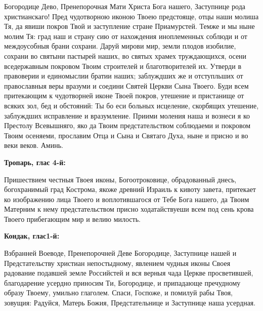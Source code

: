 \bigskip\bigskip\mychapterending

 


Богородице Дево, Пренепорочная Мати Христа Бога нашего, Заступнице рода христианскаго! Пред чудотворною иконою Твоею предстояще, отцы наши молиша Тя, да явиши покров Твой и заступление стране Приамурстей. Темже и мы ныне молим Тя: град наш и страну сию от нахождения иноплеменных соблюди и от междоусобныя брани сохрани. Даруй мирови мир, земли плодов изобилие, сохрани во святыни пастырей наших, во святых храмех труждающихся, осени вседержавным покровом Твоим строителей и благотворителей их. Утверди в правоверии и единомыслии братии наших; заблуждших же и отступльших от православныя веры вразуми и соедини Святей Церкви Сына Твоего. Буди всем притекающим к чудотворней  иконе Твоей покров, утешение и пристанище от всяких зол, бед и обстояний: Ты бо еси больных исцеление, скорбящих утешение, заблуждших исправление и вразумление. Приими моления наша и вознеси я ко Престолу Всевышняго, яко да Твоим предстательством соблюдаеми и покровом Твоим осеняеми, прославим Отца и Сына и Святаго Духа, ныне и присно и во веки веков. Аминь. 


\bigskip\bigskip\mychapterending

 
\vspace{-\baselineskip}

\bfseries Тропарь, глас 4-й:\normalfont{}\nopagebreak


Пришествием честныя Твоея иконы, Богоотроковице, обрадованный днесь, богохранимый град Кострома, якоже древний Израиль к кивоту завета, притекает ко изображению лица Твоего и воплотившагося от Тебе Бога нашего, да Твоим Матерним к нему предстательством присно ходатайствуеши всем под сень крова Твоего прибегающим мир и велию милость.


\medskip


\bfseries Кондак, глас1-й:\normalfont{}\nopagebreak


Взбранней Воеводе, Пренепорочней Деве Богородице, Заступнице нашей и Предстательству христиан непостыдному, явлением чудныя иконы Своея радование подавшей земле Российстей и вся верныя чада Церкве просветившей, благодарение усердно приносим Ти, Богородице, и припадающе пречудному образу Твоему, умильно глаголем. Спаси, Госпоже, и помилуй рабы Твоя, зовущия: Радуйся, Матерь Божия, Предстательнице и Заступнице наша усердная.



